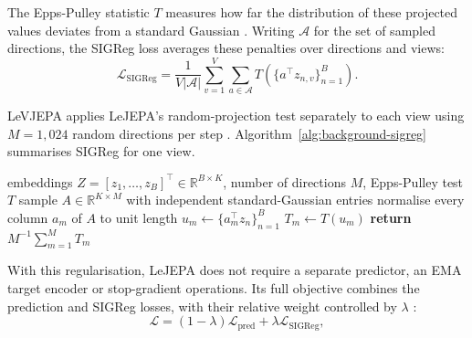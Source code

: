 The Epps-Pulley statistic $T$ measures how far the distribution of these projected values deviates from a standard Gaussian \citep[Algorithm 1]{balestriero2025lejepa}. Writing $\mathcal{A}$ for the set of sampled directions, the SIGReg loss averages these penalties over directions and views:
\begin{equation}
\mathcal{L}_{\mathrm{SIGReg}}
=\frac{1}{V|\mathcal{A}|}
\sum_{v=1}^{V}\sum_{a\in\mathcal{A}}
T\!\left(\{a^\top z_{n,v}\}_{n=1}^{B}\right).
\label{eq:background-sigreg}
\end{equation}

LeVJEPA applies LeJEPA's random-projection test separately to each view using $M=1{,}024$ random directions per step \citep[Section 4.3]{balestriero2025lejepa} \citep[Section 3.2 and Appendix A]{kuhn2026levjepaefficientscalable}. Algorithm~\ref{alg:background-sigreg} summarises SIGReg for one view.

\begin{algorithm}[hbt!]
\caption{SIGReg for one view \citep{balestriero2025lejepa,kuhn2026levjepaefficientscalable}}
\label{alg:background-sigreg}
\begin{algorithmic}[1]
\Require embeddings $Z=[z_1,\ldots,z_B]^\top\in\mathbb{R}^{B\times K}$, number of directions $M$, Epps-Pulley test $T$
\State sample $A\in\mathbb{R}^{K\times M}$ with independent standard-Gaussian entries
\State normalise every column $a_m$ of $A$ to unit length
    \State $u_m\gets\{a_m^\top z_n\}_{n=1}^{B}$ 
    \State $T_m\gets T(u_m)$ 
\EndFor
\State \textbf{return} $M^{-1}\sum_{m=1}^{M}T_m$
\end{algorithmic}
\end{algorithm}

With this regularisation, LeJEPA does not require a separate predictor, an EMA target encoder or stop-gradient operations. Its full objective combines the prediction and SIGReg losses, with their relative weight controlled by $\lambda$ \citep[Algorithm 2]{balestriero2025lejepa}:
\begin{equation}
\mathcal{L}=(1-\lambda)\mathcal{L}_{\mathrm{pred}}+\lambda\mathcal{L}_{\mathrm{SIGReg}},
\label{eq:background-lejepa-total}
\end{equation}
